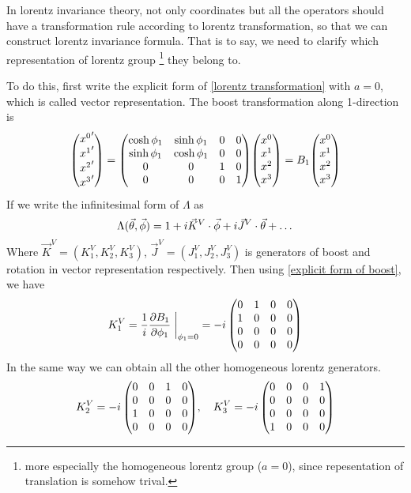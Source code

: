    In lorentz invariance theory, not only coordinates but all the operators should have a transformation rule according to lorentz transformation, so that we can construct lorentz invariance formula. That is to say, we need to clarify which representation of lorentz group \footnote{more especially the homogeneous lorentz group ($a=0$), since repesentation of translation is somehow trival. } they belong to. 
   
   To do this, first write the explicit form of \eqref{lorentz transformation} with $a=0$, which is called vector representation. The boost transformation along 1-direction is 
   \begin{equation}\label{explicit form of boost}
   \mqty({x^0}' \\ {x^1}' \\ {x^2}' \\{x^3}')
   =\mqty(\cosh \f_1 & \sinh \f_1 & 0 & 0 
        \\\sinh \f_1 & \cosh \f_1 & 0 & 0
        \\0        &  0       & 1 & 0
        \\0        &  0       & 0 & 1)
    \mqty(x^0 \\ x^1 \\ x^2 \\x^3)=B_1\mqty(x^0 \\ x^1 \\ x^2 \\x^3)
   \end{equation}
   If we write the infinitesimal form of $\Lambda$ as 
   \begin{equation}\label{infinitesimal form of Lambda}
   \Lambda(\vec{\theta},\vec{\phi}) = 1+i\vec{K}^V\cdot\vec{\phi}+i\vec{J}^V\cdot\vec{\theta}+\dots
   \end{equation}
   Where $\vec{K}^V=(K_1^V,K_2^V,K_3^V)$, $\vec{J}^V = (J_1^V,J_2^V,J_3^V)$ is generators of boost and rotation in vector representation respectively. Then using \eqref{explicit form of boost}, we  have 
   \begin{equation}\label{K1 vector representation}
   K_1^V = \frac{1}{i}\pdv{B_1}{\f_1}\eval{}_{\f_1=0}
       = -i\,\mqty(0 & 1 & 0 & 0
               \\1 & 0 & 0 & 0
               \\0 & 0 & 0 & 0
               \\0 & 0 & 0 & 0) 
   \end{equation}
   In the same way we can obtain all the other homogeneous lorentz generators.
   \begin{equation}\label{K2 K3 vector representation}
   K_2^V= -i\,\mqty(0 & 0 & 1 & 0
                \\0 & 0 & 0 & 0
                \\1 & 0 & 0 & 0
                \\0 & 0 & 0 & 0)
   ,\quad
   K_3^V= -i\,\mqty(0 & 0 & 0 & 1
                \\0 & 0 & 0 & 0
                \\0 & 0 & 0 & 0
                \\1 & 0 & 0 & 0)
   \end{equation}
